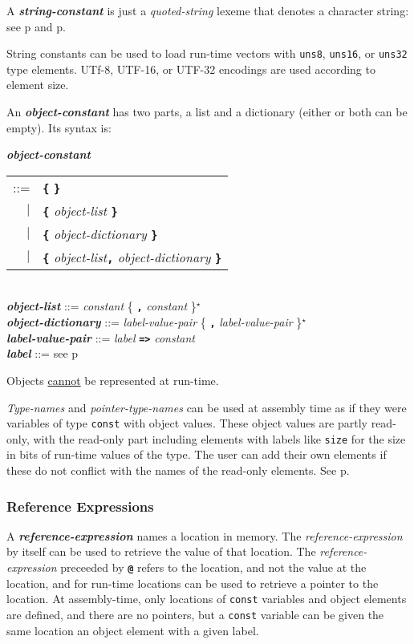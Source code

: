 \documentclass[12pt]{article}
\newcommand{\TT}[1]{{\tt \bfseries #1}}
\newcommand{\STAR}{{\Large $^\star$}}
\newcommand{\emkey}[1]{{\em \bfseries #1}}
\newcommand{\pagref}[1]{p\pageref{#1}}
\newenvironment{indpar}[1][0.3in]%
	{\begin{list}{}%
		     {\setlength{\itemsep}{0in}%
		      \setlength{\topsep}{0in}%
		      \setlength{\parsep}{1ex}%
		      \setlength{\labelwidth}{#1}%
		      \setlength{\leftmargin}{#1}%
		      \addtolength{\leftmargin}{\labelsep}}%
	 \item}%
	{\end{list}}
\begin{document}
A \emkey{string-constant} is just a {\em quoted-string} lexeme
that denotes a character string: see
\pagref{QUOTED-STRING} and \pagref{QUOTED-STRING-CONCATENATION}.

String constants can be used to load run-time vectors
with {\tt uns8}, {\tt uns16}, or {\tt uns32} type elements.
UTf-8, UTF-16, or UTF-32 encodings are used according to element
size.

An \emkey{object-constant} has two parts, a list and a dictionary
(either or both can be empty).  Its syntax is:

\begin{indpar}
\emkey{object-constant}
    \begin{tabular}[t]{rl}
    ::= & \TT{\{} \TT{\}} \\
    $|$ & \TT{\{} {\em object-list} \TT{\}} \\
    $|$ & \TT{\{} {\em object-dictionary} \TT{\}} \\
    $|$ & \TT{\{} {\em object-list}\TT{,} {\em object-dictionary} \TT{\}} \\
    \end{tabular}
\\[0.5ex]
\emkey{object-list} ::= {\em constant} \{ \TT{,} {\em constant} \}\STAR{}
\\[0.5ex]
\emkey{object-dictionary} ::= {\em label-value-pair}
                              \{ \TT{,} {\em label-value-pair} \}\STAR{}
\\[0.5ex]
\emkey{label-value-pair} ::= {\em label} \TT{=>} {\em constant}
\\[0.5ex]
\emkey{label} ::= see \pagref{LABEL}
\end{indpar}

Objects \underline{cannot} be represented at run-time.

{\em Type-names} and {\em pointer-type-names} can be used at
assembly time as if they were variables of type {\tt const}
with object values.  These object values are partly read-only,
with the read-only part including elements with labels like
{\tt size} for the size in bits of run-time values of the type.
The user can add their own elements if these do not conflict
with the names of the read-only elements.  See \pagref{TYPE-OBJECTS}.

\subsubsection{Reference Expressions}
\label{REFERENCE-EXPRESSIONS}

A \emkey{reference-expression} names a location in memory.
The {\em reference-expression} by itself can be used to retrieve
the value of that location.  The {\em reference-expression}
preceeded by \TT{@} refers to the location, and not the value
at the location, and for run-time locations can be used to retrieve
a pointer to the location.  At assembly-time, only locations of
{\tt const} variables and object elements are defined, and there
are no pointers, but a {\tt const} variable can be given the
same location an object element with a given label.
\end{document}
